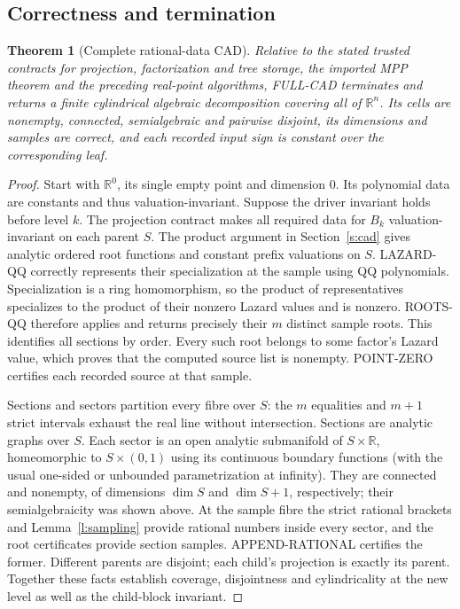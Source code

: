\documentclass[11pt]{article}
\newtheorem{theorem}{Theorem}[section]
\theoremstyle{definition}
\begin{document}
\subsection{Correctness and termination}
\begin{theorem}[Complete rational-data CAD]\label{t:fullcad}
Relative to the stated trusted contracts for projection, factorization and tree storage, the
imported MPP theorem and the preceding real-point algorithms, FULL-CAD terminates
and returns a finite cylindrical algebraic decomposition covering all of
$\mathbb R^n$. Its cells are nonempty, connected, semialgebraic and pairwise
disjoint, its dimensions and samples are correct, and each recorded input sign
is constant over the corresponding leaf.
\end{theorem}
\begin{proof}
Start with $\mathbb R^0$, its single empty point and dimension 0. Its polynomial
data are constants and thus valuation-invariant. Suppose the driver invariant
holds before level $k$. The projection contract makes all required data for
$B_k$ valuation-invariant on each parent $S$. The product argument in
Section~\ref{s:cad} gives analytic ordered root functions and constant prefix
valuations on $S$. LAZARD-QQ correctly represents their specialization at the
sample using QQ polynomials. Specialization is a ring homomorphism, so the
product of representatives specializes to the product of their nonzero Lazard
values and is nonzero. ROOTS-QQ therefore applies and returns precisely their
$m$ distinct sample roots. This identifies all sections by order. Every such root
belongs to some factor's Lazard value, which proves that the computed source list
is nonempty. POINT-ZERO certifies each recorded source at that sample.

Sections and sectors partition every fibre over $S$: the $m$ equalities and
$m+1$ strict intervals exhaust the real line without intersection. Sections are
analytic graphs over $S$. Each sector is an open analytic submanifold of
$S\times\mathbb R$, homeomorphic to $S\times(0,1)$ using its continuous boundary
functions (with the usual one-sided or unbounded parametrization at infinity).
They are connected and nonempty, of dimensions $\dim S$ and $\dim S+1$,
respectively; their semialgebraicity was shown above. At the sample fibre the
strict rational brackets and Lemma~\ref{l:sampling} provide rational numbers
inside every sector, and the root certificates provide section samples.
APPEND-RATIONAL certifies the former.
Different parents are disjoint; each child's projection is exactly its parent.
Together these facts establish coverage, disjointness and cylindricality at the
new level as well as the child-block invariant.


\end{proof}
\end{document}
